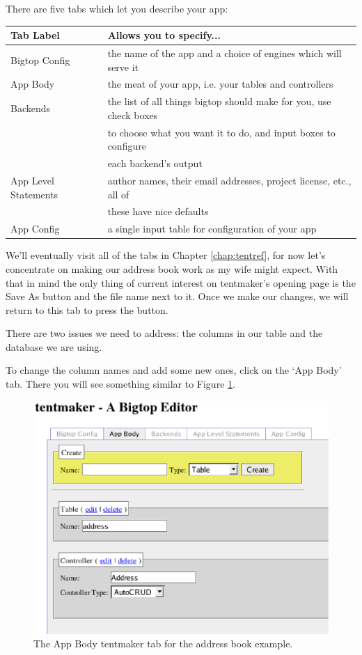 There are five tabs which let you describe your app:

\begin{tabular}{l|l}
Tab Label & Allows you to specify... \\
\hline
Bigtop Config &
    the name of the app and a choice of engines which will serve it \\

App Body &
    the meat of your app, i.e. your tables and controllers \\

Backends &
    the list of all things bigtop should make for you, use check boxes \\
 &  to choose what you want it to do, and input boxes to configure \\
 &  each backend's output \\

App Level Statements &
    author names, their email addresses, project license, etc., all of \\
 &  these have nice defaults \\

App Config &
    a single input table for configuration of your app \\
\end{tabular}

We'll eventually visit all of the tabs in Chapter \ref{chap:tentref},
for now let's concentrate on making our address book work as my wife might
expect.  With that in mind the only thing of current interest on tentmaker's
opening page is the Save As button and the file name next to it.
Once we make our changes, we will return to this tab to press the button.

There are two issues we need to address: the columns in our table and
the database we are using.

To change the column names and add some new ones, click on the `App Body'
tab.  There you will see something similar to Figure \ref{fig:appbody}.

\begin{figure}
\includegraphics[width=6in]{appbody}
\caption{The App Body tentmaker tab for the address book example.}
\label{fig:appbody}
\end{figure}

